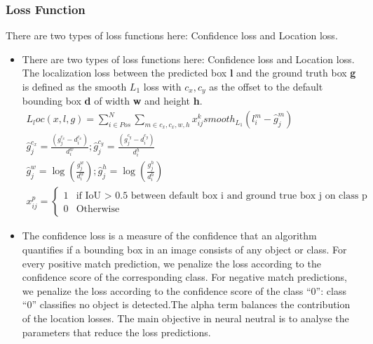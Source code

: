         \subsubsection{Loss Function}
            There are two types of loss functions here: Confidence loss and Location loss.
            \begin{itemize}
                \item There are two types of loss functions here: Confidence loss and Location loss. \\
                    \vspace{3mm}
                    The localization loss between the predicted box \textbf{l} and the ground truth box \textbf{g} is defined as the smooth $L_1$ loss with \textbf{$c_x,c_y$} as the offset to the default bounding box \textbf{d} of width \textbf{w} and height \textbf{h}.
                    \begin{align}
                        L_loc(x,l,g) = \displaystyle\sum_{i \in Pos}^{N} \displaystyle\sum_{m \in c_x,c_x,w,h} x_{ij}^k smooth_{L_1} (l_i^m - \hat{g}_j^m) \\ 
                        \hat{g}_j^{c_x} =\frac{(g_j^{c_x} - d_i^{c_x})}{d_i^w} ; \hat{g}_j^{c_y} = \frac{(g_j^{c_y} - d_i^{c_y})}{d_i^h} \\ 
                        \hat{g}_j^w = \log(\frac{g_j^w}{d_i^w}) ; \hat{g}_j^h = \log(\frac{g_j^h}{d_i^h}) \\
                        x_{ij}^p = \left\{ 
                            \begin{array}{ll}
                                1 & \mbox{if IoU > 0.5 between default box i and ground true box j on class p} \\ 
                                0 & \mbox{Otherwise} 
                            \end{array}
                        \right.
                    \end{align} 
                \item The confidence loss is a measure of the confidence that an algorithm quantifies if a bounding box in an image consists of any object or class. For every positive match prediction, we penalize the loss according to the confidence score of the corresponding class. For negative match predictions, we penalize the loss according to the confidence score of the class “0”: class “0” classifies no object is detected.The alpha term balances the contribution of the location losses. The main objective in neural neutral is to analyse the parameters that reduce the loss predictions. \\ 

\end{itemize}
